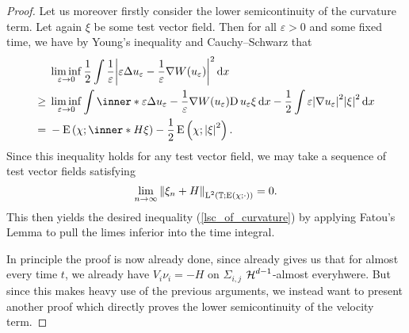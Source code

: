 \begin{proof}
	Let us moreover firstly consider the lower semicontinuity of the curvature 
	term. Let again $ \xi $ be some test vector field. Then for all $ 
	\varepsilon > 0 $ and some fixed time, we have by Young's inequality and 
	Cauchy--Schwarz that
	\begin{align*}
		& 
		\liminf_{ \varepsilon \to 0 }
		\frac{ 1 }{ 2 }
		\int
			\frac{ 1 }{ \varepsilon }
			\abs{ 
				\varepsilon
				\Delta u_{ \varepsilon }
				-
				\frac{ 1 }{ \varepsilon }
				\nabla W ( u_{ \varepsilon } )
			}^{ 2 }
		\dd{ x }
		\\
		\geq{} &
		\liminf_{ \varepsilon \to 0 }
		\int
			\inner*{ 
				\varepsilon
				\Delta u_{ \varepsilon }
				-
				\frac{ 1 }{ \varepsilon }
				\nabla W ( u_{ \varepsilon } )
			}{
				\diff u_{ \varepsilon } \xi
			}
		\dd{ x }
		-
		\frac{ 1 }{ 2 }
		\int 
			\varepsilon
			\abs{ \nabla u_{ \varepsilon } }^{ 2 }
			\abs{ \xi }^{ 2 }
		\dd{ x }
		\\
		={} &
		-\energy \left( \chi ; \inner*{ H }{ \xi } \right)
		-
		\frac{ 1 }{ 2 }
		\energy \left( \chi ; \abs{ \xi }^{ 2 } \right).
	\end{align*}
	Since this inequality holds for any test vector field, we may take a 
	sequence of test vector fields satisfying
	\begin{equation*}
		\lim_{ n \to \infty }
			\norm{ \xi_{ n } + H }_{ \operatorname{L}^{ 2 } \left( \operatorname{\mathbb{T}} ; \operatorname{E} 
			( 
			\chi ; \cdot ) \right) } 
		=
		0.
	\end{equation*}
	This then yields the desired inequality (\ref{lsc_of_curvature}) by 
	applying Fatou's Lemma to pull the limes inferior into the time integral.
	
	In principle the proof is now already done, since 
	 already gives us that for almost every 
	time $ t $, we already have $ V_{ i } \nu_{ i } = - H $ on $ \Sigma_{ i , j 
	} $ $ \operatorname{\mathcal{H}}^{ d-  1 } $-almost everyhwere. But since this makes heavy use of 
	the previous arguments, we instead want to present another proof which 
	directly proves the lower semicontinuity of the velocity term.
	

\end{proof}
